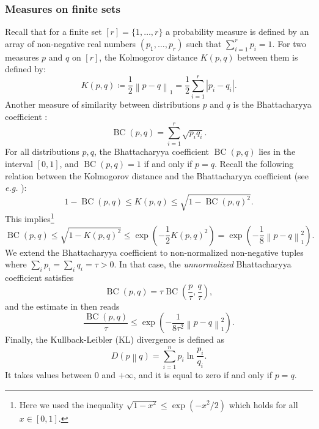 \documentclass[notitlepage, 11pt, letterpaper]{amsart}
\theoremstyle{plain}
\theoremstyle{definition}
\let\cref\crtcref
\DeclareMathOperator{\BC}{BC} %
\newcommand{\norm}[1]{\left\lVert#1\right\rVert}
\newcommand{\abs}[1]{\left|#1\right|}
\newcommand{\kl}[2]{D\!\left(#1\middle\|#2\right)} %
\begin{document}
\subsubsection{Measures on finite sets}

Recall that for a finite set $[r]=\{ 1, \ldots, r\}$ a probability measure is defined by an array of non-negative real numbers $(p_1, \ldots, p_r)$ such that $\sum_{i=1}^r p_i =1$.
For two measures $p$ and $q$ on $[r]$, the Kolmogorov distance $K(p,q)$ between them is defined by:
\begin{equation}
    K(p,q) \coloneqq \frac{1}{2}\norm{p-q}_1
    = \frac{1}{2} \sum_{i=1}^r \abs{p_i - q_i}.
\end{equation}
Another measure of similarity between distributions $p$ and $q$ is the Bhattacharyya coefficient \cite{bhattacharyya1946measure,fuchs2002cryptographic}:
\begin{equation}
    \label{eq:Bhattacharyya_coefficient}
    \BC(p,q) = \sum_{i=1}^r \sqrt{p_iq_i}.
\end{equation}
For all distributions $p, q$, the Bhattacharyya coefficient $\BC(p,q)$ lies in the interval $[0,1]$, and $\BC(p,q)=1$ if and only if $p=q$.
Recall the following relation between
the Kolmogorov distance and the Bhattacharyya coefficient (see {\em e.g.} \cite[Proposition 5, Equation (41)]{fuchs2002cryptographic}):
\begin{equation}
    1-\BC(p,q) \leq K(p,q) \leq \sqrt{1-\BC(p,q)^2}.
\end{equation}
This implies\footnote{Here we used the inequality $\sqrt{1-x^2} \leq \exp(-x^2/2)$ which holds for all $x \in [0,1]$.}
\begin{equation}
    \label{eq:BC_norm_estimate}
    \BC(p,q) \leq \sqrt{1-K(p,q)^2} \leq \exp\left(- \frac{1}{2} K(p,q)^2\right)=
    \exp\left(- \frac{1}{8} \norm{p-q}_1^2\right).
\end{equation}
We extend the Bhattacharyya coefficient to non-normalized non-negative tuples where $\sum_i p_i = \sum_i q_i = \tau >0$.
In that case, the \textit{unnormalized} Bhattacharyya coefficient satisfies
\begin{equation}
    \BC(p,q) = \tau  \BC\left(\frac{p}{\tau}, \frac{q}{\tau}\right),
\end{equation}
and the estimate in \cref{eq:BC_norm_estimate} then reads
\begin{equation}
    \label{eq:bhattacharyya_vs_distance}
    \frac{\BC(p,q)}{\tau} \leq \exp\left(-\frac{1}{8\tau^2}\norm{p-q}_1^2\right).
\end{equation}
Finally, the Kullback-Leibler (KL) divergence is defined as
\begin{equation}
    \label{eq:KL_divergence}
    \kl{p}{q} = \sum_{i=1}^{n} p_i \ln \frac{p_i}{q_i}.
\end{equation}
It takes values between $0$ and $+\infty$, and it is equal to zero if and only if $p=q$.
\end{document}
